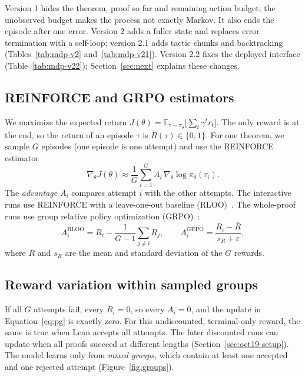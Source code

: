 \documentclass[11pt]{article}
\begin{document}
Version 1 hides the theorem, proof so far and remaining action budget; the unobserved budget makes the process not exactly Markov.
It also ends the episode after one error.
Version 2 adds a fuller state and replaces error termination with a self-loop; version 2.1 adds tactic chunks and backtracking (Tables~\ref{tab:mdp-v2} and~\ref{tab:mdp-v21}).
Version 2.2 fixes the deployed interface (Table~\ref{tab:mdp-v22}); Section~\ref{sec:next} explains these changes.

\subsection{REINFORCE and GRPO estimators}
We maximize the expected return $J(\theta) = \mathbb{E}_{\tau \sim \pi_\theta}\big[\sum_t \gamma^t r_t\big]$.
The only reward is at the end, so the return of an episode $\tau$ is $R(\tau) \in \{0, 1\}$.
For one theorem, we sample $G$ episodes (one episode is one attempt) and use the REINFORCE estimator~\cite{williams1992}
\begin{equation}
\nabla_\theta J(\theta) \approx \frac{1}{G}\sum_{i=1}^{G} A_i \, \nabla_\theta \log \pi_\theta(\tau_i).
\label{eq:pg}
\end{equation}
The \emph{advantage} $A_i$ compares attempt $i$ with the other attempts.
The interactive runs use REINFORCE with a leave-one-out baseline (RLOO)~\cite{ahmadian2024}.
The whole-proof runs use group relative policy optimization (GRPO)~\cite{shao2024,trl}:
\begin{equation}
A_i^{\text{RLOO}} = R_i - \frac{1}{G-1}\sum_{j \neq i} R_j, \qquad
A_i^{\text{GRPO}} = \frac{R_i - \bar R}{s_R + \varepsilon},
\label{eq:rloo}
\end{equation}
where $\bar R$ and $s_R$ are the mean and standard deviation of the $G$ rewards.

\subsection{Reward variation within sampled groups}
\label{sec:zero}
If all $G$ attempts fail, every $R_i = 0$, so every $A_i = 0$, and the update in Equation~\eqref{eq:pg} is exactly zero.
For this undiscounted, terminal-only reward, the same is true when Lean accepts all attempts.
The later discounted runs can update when all proofs succeed at different lengths (Section~\ref{sec:oct19-setup}).
The model learns only from \emph{mixed groups}, which contain at least one accepted and one rejected attempt (Figure~\ref{fig:groups}).
\end{document}
